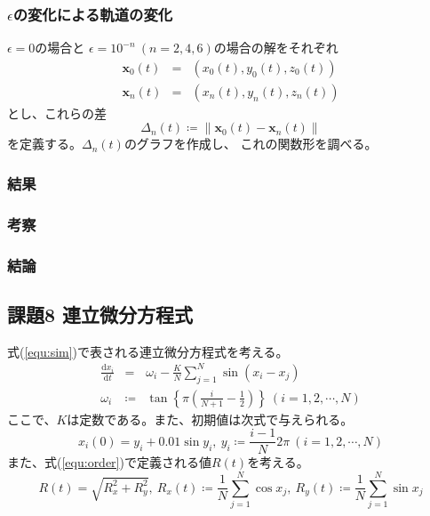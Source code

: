 \documentclass[a4j, titlepage]{jsarticle}
\numberwithin{equation}{section}
\begin{document}
        \subsubsection{$\epsilon$の変化による軌道の変化}
            $\epsilon = 0$の場合と
            $\epsilon = 10^{-n} \ (n = 2, 4, 6)$の場合の解をそれぞれ
            \begin{eqnarray*}
                \bm{x}_0(t) &=& (x_0(t), y_0(t), z_0(t)) \\
                \bm{x}_n(t) &=& (x_n(t), y_n(t), z_n(t))
            \end{eqnarray*}
            とし、これらの差
            \begin{equation*}
                \Delta_n(t) \coloneqq \|\bm{x}_0(t) - \bm{x}_n(t)\|
            \end{equation*}
            を定義する。$\Delta_n(t)$のグラフを作成し、
            これの関数形を調べる。

        \subsubsection{結果}
        \subsubsection{考察}
        \subsubsection{結論}

    \subsection{課題8 連立微分方程式}
        式(\ref{equ:sim})で表される連立微分方程式を考える。
        \begin{eqnarray}
            \frac{\mathrm{d}x_i}{\mathrm{d}t} &=& \omega_i - \frac{K}{N}\sum^N_{j=1}\sin(x_i-x_j) \label{equ:sim} \\
            \omega_i &\coloneqq& \tan\left\{\pi\left(\frac{i}{N + 1} - \frac{1}{2}\right)\right\} \ (i = 1, 2, \cdots, N) \nonumber
        \end{eqnarray}
        ここで、$K$は定数である。また、初期値は次式で与えられる。
        \begin{equation*}
            x_i(0) = y_i + 0.01\sin y_i, \ y_i \coloneqq \frac{i - 1}{N}2\pi \ (i = 1, 2, \cdots, N)
        \end{equation*}
        また、式(\ref{equ:order})で定義される値$R(t)$を考える。
        \begin{equation}
            R(t) = \sqrt{R_x^2 + R_y^2}, \ R_x(t) \coloneqq \frac{1}{N}\sum^N_{j=1}\cos x_j, \ R_y(t) \coloneqq \frac{1}{N}\sum^N_{j=1}\sin x_j \label{equ:order}
        \end{equation}
\end{document}
